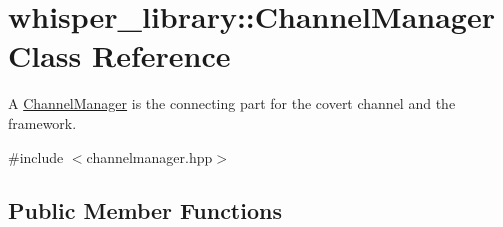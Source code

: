 \hypertarget{classwhisper__library_1_1ChannelManager}{\section{whisper\-\_\-library\-:\-:\-Channel\-Manager \-Class \-Reference}
\label{classwhisper__library_1_1ChannelManager}
}


\-A \hyperlink{classwhisper__library_1_1ChannelManager}{\-Channel\-Manager} is the connecting part for the covert channel and the framework.  




{\ttfamily \#include $<$channelmanager.\-hpp$>$}

\subsection*{\-Public \-Member \-Functions}
